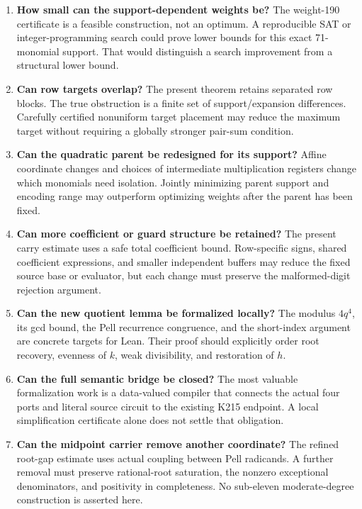 \documentclass[11pt,a4paper]{article}
\theoremstyle{definition}
\theoremstyle{remark}
\numberwithin{equation}{section}
\begin{document}
\begin{enumerate}
\item \textbf{How small can the support-dependent weights be?}
The weight-190 certificate is a feasible construction, not an optimum.
A reproducible SAT or integer-programming search could prove lower
bounds for this exact 71-monomial support. That would distinguish a
search improvement from a structural lower bound.
\item \textbf{Can row targets overlap?}
The present theorem retains separated row blocks. The true obstruction
is a finite set of support/expansion differences. Carefully certified
nonuniform target placement may reduce the maximum target without
requiring a globally stronger pair-sum condition.
\item \textbf{Can the quadratic parent be redesigned for its support?}
Affine coordinate changes and choices of intermediate multiplication
registers change which monomials need isolation. Jointly minimizing
parent support and encoding range may outperform optimizing weights
after the parent has been fixed.
\item \textbf{Can more coefficient or guard structure be retained?}
The present carry estimate uses a safe total coefficient bound.
Row-specific signs, shared coefficient expressions, and smaller
independent buffers may reduce the fixed source base or evaluator,
but each change must preserve the malformed-digit rejection argument.
\item \textbf{Can the new quotient lemma be formalized locally?}
The modulus $4q^4$, its gcd bound, the Pell recurrence congruence,
and the short-index argument are concrete targets for Lean. Their
proof should explicitly order root recovery, evenness of $k$, weak
divisibility, and restoration of $h$.
\item \textbf{Can the full semantic bridge be closed?}
The most valuable formalization work is a data-valued compiler that
connects the actual four ports and literal source circuit to the
existing K215 endpoint. A local simplification certificate alone
does not settle that obligation.
\item \textbf{Can the midpoint carrier remove another coordinate?}
The refined root-gap estimate uses actual coupling between Pell
radicands. A further removal must preserve rational-root saturation,
the nonzero exceptional denominators, and positivity in completeness.
No sub-eleven moderate-degree construction is asserted here.
\end{enumerate}
\end{document}
